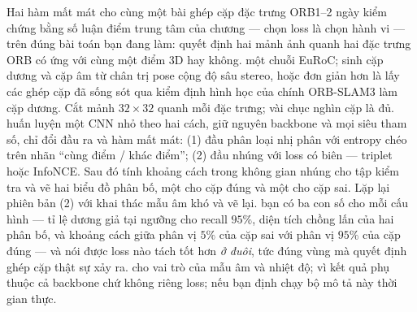 \documentclass[../../deep_learning.tex]{subfiles}
\begin{document}
\begin{ungdung}
\end{ungdung}

\begin{duan}{Hai hàm mất mát cho cùng một bài ghép cặp đặc trưng ORB}{1--2 ngày}
\dmt kiểm chứng bằng số luận điểm trung tâm của chương --- chọn loss là chọn hành vi --- trên đúng bài toán bạn đang làm: quyết định hai mảnh ảnh quanh hai đặc trưng ORB có ứng với cùng một điểm 3D hay không.
\ddl một chuỗi EuRoC; sinh cặp dương và cặp âm từ chân trị pose cộng độ sâu stereo, hoặc đơn giản hơn là lấy các ghép cặp đã sống sót qua kiểm định hình học của chính ORB-SLAM3 làm cặp dương. Cắt mảnh \(32\times32\) quanh mỗi đặc trưng; vài chục nghìn cặp là đủ.
\dbc huấn luyện một CNN nhỏ theo hai cách, giữ nguyên backbone và mọi siêu tham số, chỉ đổi đầu ra và hàm mất mát: (1) đầu phân loại nhị phân với entropy chéo trên nhãn ``cùng điểm / khác điểm''; (2) đầu nhúng với loss có biên --- triplet hoặc InfoNCE. Sau đó tính khoảng cách trong không gian nhúng cho tập kiểm tra và vẽ hai biểu đồ phân bố, một cho cặp đúng và một cho cặp sai. Lặp lại phiên bản (2) với khai thác mẫu âm khó và vẽ lại.
\dxk bạn có ba con số cho mỗi cấu hình --- tỉ lệ dương giả tại ngưỡng cho recall \(95\%\), diện tích chồng lấn của hai phân bố, và khoảng cách giữa phân vị \(5\%\) của cặp sai với phân vị \(95\%\) của cặp đúng --- và nói được loss nào tách tốt hơn \emph{ở đuôi}, tức đúng vùng mà quyết định ghép cặp thật sự xảy ra.
\dnv {} cho vai trò của mẫu âm và nhiệt độ;  vì kết quả phụ thuộc cả backbone chứ không riêng loss;  nếu bạn định chạy bộ mô tả này thời gian thực.
\end{duan}
\end{document}
